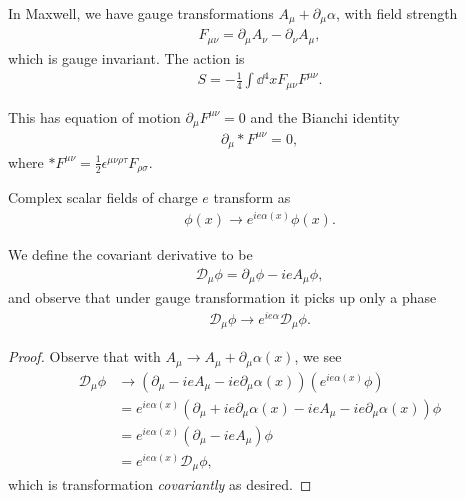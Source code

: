 In Maxwell, we have gauge transformations $A_\mu + \partial_\mu \alpha$, with field strength
\begin{align}
    F_{\mu \nu} = \partial_\mu A_\nu - \partial_\nu A_\mu
,\end{align}
which is gauge invariant. The action is
\begin{align}
    S = -\frac{1}{4} \int \dd{^{4}x} F_{\mu \nu} F^{\mu \nu}
.\end{align}

This has equation of motion $\partial_\mu F^{\mu \nu} = 0$ and the Bianchi identity
\begin{align}
    \partial_\mu \ast F^{\mu \nu} = 0
,\end{align}
where $\ast F^{\mu \nu} = \frac{1}{2} \epsilon^{\mu \nu \rho \tau} F_{\rho \sigma}$.

Complex scalar fields of charge $e$ transform as
\begin{align}
    \phi \left( x \right) \to e^{i e \alpha \left( x \right) } \phi \left( x \right) 
.\end{align}

We define the covariant derivative to be
\begin{align}
    \mathcal{D}_\mu \phi = \partial_\mu \phi - i e A_\mu \phi
,\end{align}
and observe that under gauge transformation it picks up only a phase
\begin{align}
    \mathcal{D}_\mu \phi \to e^{ie \alpha} \mathcal{D}_\mu \phi
.\end{align}

\begin{proof}
    Observe that with $A_\mu \to A_\mu + \partial_\mu \alpha \left( x \right) $, we see
    \begin{align}
        \mathcal{D}_\mu \phi &\to \left( \partial_\mu -ie A_\mu - ie \partial_\mu \alpha \left( x \right)  \right) \left( e^{ie \alpha \left( x \right) } \phi \right)  \\
        &= e^{ie \alpha \left( x \right) } \left( \partial_\mu + i e \partial_\mu \alpha \left( x \right) - i e A_\mu - ie \partial_\mu \alpha \left( x \right)  \right) \phi   \\
        &= e^{ie \alpha \left( x \right) } \left( \partial_\mu - i e A_\mu  \right) \phi   \\
        &= e^{i e \alpha \left( x \right) } \mathcal{D}_\mu \phi
    ,\end{align}
    which is transformation \emph{covariantly} as desired.
\end{proof}

